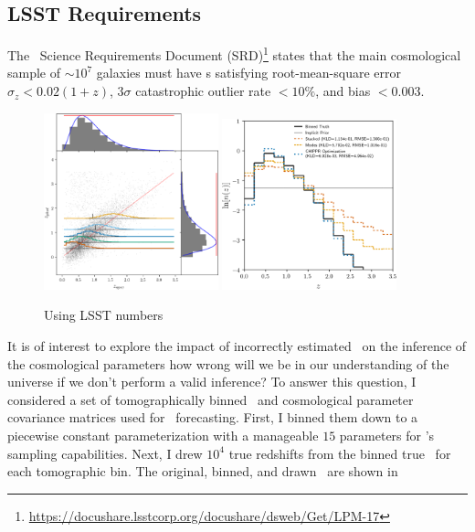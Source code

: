 
\subsection{LSST Requirements}

The \lsst\ Science Requirements Document (SRD)\footnote{\url{https://docushare.lsstcorp.org/docushare/dsweb/Get/LPM-17}} states that the main cosmological sample of $\sim 10^{7}$ galaxies must have \pz s satisfying root-mean-square error $\sigma_z < 0.02 (1+z)$, $3 \sigma$ catastrophic outlier rate $< 10\%$, and bias $< 0.003$.

\begin{figure}
	\begin{center}
		\includegraphics[width=0.45\textwidth]{figures/chippr/lsst_scatter.png}
		\includegraphics[width=0.45\textwidth]{figures/chippr/lsst_log_estimators.png}
		\caption{Using LSST numbers
		}
	\end{center}
\end{figure}

It is of interest to explore the impact of incorrectly estimated \nz\ on the inference of the cosmological parameters \textemdash how wrong will we be in our understanding of the universe if we don't perform a valid inference?
To answer this question, I considered a set of tomographically binned \nz\ and cosmological parameter covariance matrices used for \desc\ forecasting.
First, I binned them down to a piecewise constant parameterization with a manageable $15$ parameters for \chippr's sampling capabilities.
Next, I drew $10^{4}$ true redshifts from the binned true \nz\ for each tomographic bin.
The original, binned, and drawn \nz\ are shown in 

